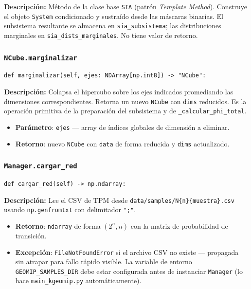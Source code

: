 \textbf{Descripción:} Método de la clase base \texttt{SIA} (patrón
\textit{Template Method}). Construye el objeto \texttt{System} condicionado y
sustraído desde las máscaras binarias. El subsistema resultante se almacena en
\texttt{sia\_subsistema}; las distribuciones marginales en
\texttt{sia\_dists\_marginales}. No tiene valor de retorno.

\subsubsection*{\texttt{NCube.marginalizar}}

\begin{lstlisting}
def marginalizar(self, ejes: NDArray[np.int8]) -> "NCube":
\end{lstlisting}

\textbf{Descripción:} Colapsa el hipercubo sobre los ejes indicados promediando
las dimensiones correspondientes. Retorna un nuevo \texttt{NCube} con
\texttt{dims} reducidos. Es la operación primitiva de la preparación del
subsistema y de \texttt{\_calcular\_phi\_total}.

\begin{itemize}
  \item \textbf{Parámetro}: \texttt{ejes} — array de índices globales de dimensión
        a eliminar.
  \item \textbf{Retorno}: nuevo \texttt{NCube} con \texttt{data} de forma reducida
        y \texttt{dims} actualizado.
\end{itemize}

\subsubsection*{\texttt{Manager.cargar\_red}}

\begin{lstlisting}
def cargar_red(self) -> np.ndarray:
\end{lstlisting}

\textbf{Descripción:} Lee el CSV de TPM desde \texttt{data/samples/N\{n\}\{muestra\}.csv}
usando \texttt{np.genfromtxt} con delimitador \texttt{";"}.

\begin{itemize}
  \item \textbf{Retorno}: \texttt{ndarray} de forma $(2^n, n)$ con la
        matriz de probabilidad de transición.
  \item \textbf{Excepción}: \texttt{FileNotFoundError} si el archivo CSV
        no existe — propagada sin atrapar para fallo rápido visible.
        La variable de entorno \texttt{GEOMIP\_SAMPLES\_DIR} debe estar
        configurada antes de instanciar \texttt{Manager} (lo hace
        \texttt{main\_kgeomip.py} automáticamente).
\end{itemize}

